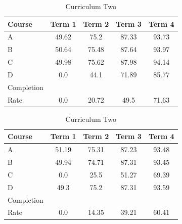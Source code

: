 \documentclass[botnum, fleqn]{unmeethesis}
\begin{document}
    \begin{table}[!h]
      \tiny
      \caption{}
      \begin{subtable}{0.45\linewidth}
        \centering
          \caption{Curriculum One}
          \label{tab:simple4}
          \begin{tabular}{l*{4}{c}}
            Course  & Term 1 & Term 2 & Term 3 & Term 4 \\
            \hline
            A       & 49.62 & 75.2  & 87.33 & 93.73 \\
            B       & 50.64 & 75.48 & 87.64 & 93.97 \\
            C       & 49.98 & 75.62 & 87.98 & 94.14 \\
            D       & 0.0 & 44.1 & 71.89 & 85.77 \\
            \hline
            Completion \\ Rate & 0.0 & 20.72 & 49.5 & 71.63
          \end{tabular}
      \end{subtable}\hfill
      \begin{subtable}{0.45\linewidth}
        \centering
          \caption{Curriculum Two}
          \label{tab:simple7}
          \begin{tabular}{l*{4}{c}}
            Course  & Term 1 & Term 2 & Term 3 & Term 4 \\
            \hline
            A       & 51.19 & 75.31 & 87.23 & 93.48 \\
            B       & 49.94 & 74.71 & 87.31 & 93.45 \\
            C       & 0.0   & 25.5  & 51.27 & 69.39 \\
            D       & 49.3  & 75.2  & 87.31 & 93.59 \\
            \hline
            Completion \\ Rate & 0.0 & 14.35 & 39.21 & 60.41 \\
          \end{tabular}
      \end{subtable}


\end{table}
\end{document}
